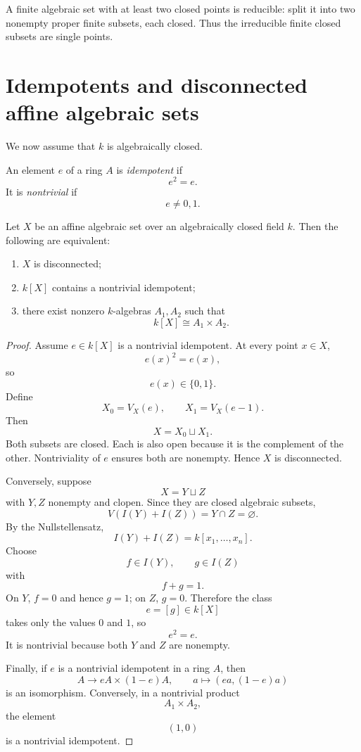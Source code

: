 \begin{example}\label{ex:vi05-expand-03}
A finite algebraic set with at least two closed points is reducible: split it into two nonempty proper finite subsets, each closed.  Thus the irreducible finite closed subsets are single points.
\end{example}
\section{Idempotents and disconnected affine algebraic sets}

We now assume that \(k\) is algebraically closed.

\begin{definition}[Idempotent]
An element \(e\) of a ring \(A\) is \emph{idempotent} if
\[
e^2=e.
\]
It is \emph{nontrivial} if
\[
e\neq0,1.
\]
\end{definition}

\begin{theorem}
\label{thm:vi05-idempotent-criterion}
Let \(X\) be an affine algebraic set over an algebraically closed field \(k\).  Then the
following are equivalent:
\begin{enumerate}
  \item \(X\) is disconnected;
  \item \(k[X]\) contains a nontrivial idempotent;
  \item there exist nonzero \(k\)-algebras \(A_1,A_2\) such that
        \[
        k[X]\cong A_1\times A_2.
        \]
\end{enumerate}
\end{theorem}

\begin{proof}
Assume \(e\in k[X]\) is a nontrivial idempotent.  At every point \(x\in X\),
\[
e(x)^2=e(x),
\]
so
\[
e(x)\in\{0,1\}.
\]
Define
\[
X_0=V_X(e),
\qquad
X_1=V_X(e-1).
\]
Then
\[
X=X_0\sqcup X_1.
\]
Both subsets are closed.  Each is also open because it is the complement of the other.
Nontriviality of \(e\) ensures both are nonempty.  Hence \(X\) is disconnected.

Conversely, suppose
\[
X=Y\sqcup Z
\]
with \(Y,Z\) nonempty and clopen.  Since they are closed algebraic subsets,
\[
V(I(Y)+I(Z))=Y\cap Z=\varnothing.
\]
By the Nullstellensatz,
\[
I(Y)+I(Z)=k[x_1,\dots,x_n].
\]
Choose
\[
f\in I(Y),
\qquad
g\in I(Z)
\]
with
\[
f+g=1.
\]
On \(Y\), \(f=0\) and hence \(g=1\); on \(Z\), \(g=0\).  Therefore the class
\[
e=[g]\in k[X]
\]
takes only the values \(0\) and \(1\), so
\[
e^2=e.
\]
It is nontrivial because both \(Y\) and \(Z\) are nonempty.

Finally, if \(e\) is a nontrivial idempotent in a ring \(A\), then
\[
A\longrightarrow eA\times(1-e)A,
\qquad
a\longmapsto(ea,(1-e)a)
\]
is an isomorphism.  Conversely, in a nontrivial product
\[
A_1\times A_2,
\]
the element
\[
(1,0)
\]
is a nontrivial idempotent.
\end{proof}

